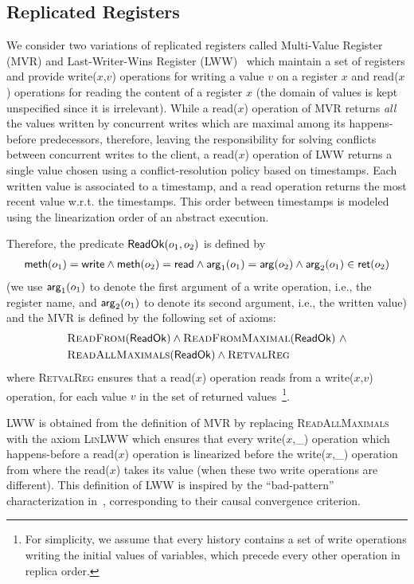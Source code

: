 \subsection{Replicated Registers}

We consider two variations of replicated registers called Multi-Value Register (MVR) and Last-Writer-Wins Register (LWW)~\cite{DBLP:journals/eatcs/ShapiroPBZ11} which maintain a set of registers and provide {\sf write}($x$,$v$) operations for writing a value $v$ on a register $x$ and {\sf read}($x$) operations for reading the content of a register $x$ (the domain of values is kept unspecified since it is irrelevant). While a {\sf read}($x$) operation of MVR returns \emph{all} the values written by concurrent writes which are maximal among its happens-before predecessors, therefore, leaving the responsibility for solving conflicts between concurrent writes to the client, a {\sf read}($x$) operation of LWW returns a single value chosen using a conflict-resolution policy based on timestamps. Each written value is associated to a timestamp, and a {\sf read} operation returns the most recent value w.r.t. the timestamps. This order between timestamps is modeled using the linearization order of an abstract execution.

Therefore, the predicate ${\sf ReadOk}(o_1,o_2)$ is defined by
\begin{align*}
{\sf meth}(o_1) = {\sf write} \land {\sf meth}(o_2) ={\sf read} \land {\sf arg}_1(o_1)= {\sf arg}(o_2) \land {\sf arg}_2(o_1)\in {\sf ret}(o_2)
\end{align*}
(we use ${\sf arg}_1(o_1)$ to denote the first argument of a {\sf write} operation, i.e., the register name, and ${\sf arg}_2(o_1)$ to denote its second argument, i.e., the written value) and the MVR is defined by the following set of axioms:
\begin{align*}
&\textsc{ReadFrom}({\sf ReadOk})\land \textsc{ReadFromMaximal}({\sf ReadOk})\ \land \\
& \textsc{ReadAllMaximals}({\sf ReadOk})\land \textsc{RetvalReg}
\end{align*}
where \textsc{RetvalReg} ensures that a {\sf read}($x$) operation reads from a {\sf write}($x$,$v$) operation, for each value $v$ in the set of returned values~\footnote{For simplicity, we assume that every history contains a set of {\sf write} operations writing the initial values of variables, which precede every other operation in replica order.}.

LWW is obtained from the definition of MVR by replacing \textsc{ReadAllMaximals} with the axiom \textsc{LinLWW} which ensures that every {\sf write}($x$,\_) operation which happens-before a {\sf read}($x$) operation is linearized before the {\sf write}($x$,\_) operation from where the {\sf read}($x$) takes its value (when these two {\sf write} operations are different). This definition of LWW is inspired by the ``bad-pattern'' characterization in~\cite{DBLP:conf/popl/BouajjaniEGH17}, corresponding to their causal convergence criterion.

